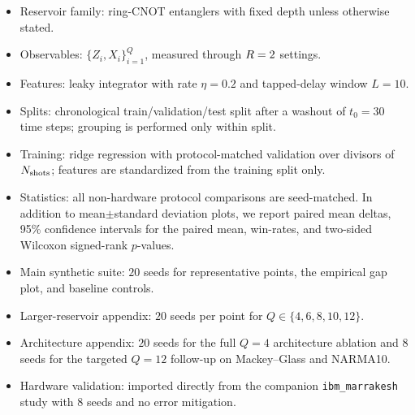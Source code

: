 \begin{itemize}[leftmargin=*]
    \item Reservoir family: ring-CNOT entanglers with fixed depth unless otherwise stated.
    \item Observables: $\{Z_i,X_i\}_{i=1}^Q$, measured through $R=2$ settings.
    \item Features: leaky integrator with rate $\eta=0.2$ and tapped-delay window $L=10$.
    \item Splits: chronological train/validation/test split after a washout of $t_0=30$ time steps; grouping is performed only within split.
    \item Training: ridge regression with protocol-matched validation over divisors of $N_{\mathrm{shots}}$; features are standardized from the training split only.
    \item Statistics: all non-hardware protocol comparisons are seed-matched. In addition to mean$\pm$standard deviation plots, we report paired mean deltas, 95\% confidence intervals for the paired mean, win-rates, and two-sided Wilcoxon signed-rank $p$-values.
    \item Main synthetic suite: $20$ seeds for representative points, the empirical gap plot, and baseline controls.
    \item Larger-reservoir appendix: $20$ seeds per point for $Q\in\{4,6,8,10,12\}$.
    \item Architecture appendix: $20$ seeds for the full $Q=4$ architecture ablation and $8$ seeds for the targeted $Q=12$ follow-up on Mackey--Glass and NARMA10.
    \item Hardware validation: imported directly from the companion \texttt{ibm\_marrakesh} study with $8$ seeds and no error mitigation.
\end{itemize}
